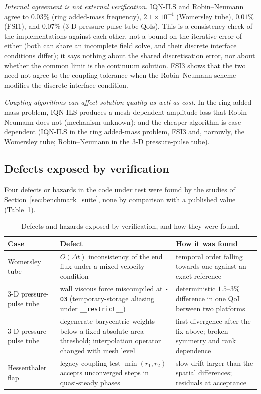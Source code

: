 \emph{Internal agreement is not external verification.}
IQN-ILS and Robin--Neumann agree to $0.03\%$ (ring added-mass frequency), $2.1\times10^{-4}$ (Womersley tube), $0.01\%$ (FSI1), and $0.07\%$ (3-D pressure-pulse tube QoIs).
This is a consistency check of the implementations against each other, not a bound on the iterative error of either (both can share an incomplete field solve, and their discrete interface conditions differ); it says nothing about the shared discretisation error, nor about whether the common limit is the continuum solution.
FSI3 shows that the two need not agree to the coupling tolerance when the Robin--Neumann scheme modifies the discrete interface condition.

\emph{Coupling algorithms can affect solution quality as well as cost.}
In the ring added-mass problem, IQN-ILS produces a mesh-dependent amplitude loss that Robin--Neumann does not (mechanism unknown); and the cheaper algorithm is case dependent (IQN-ILS in the ring added-mass problem, FSI3 and, narrowly, the Womersley tube; Robin--Neumann in the 3-D pressure-pulse tube).


\subsection{Defects exposed by verification}\label{sec:defects}

Four defects or hazards in the code under test were found by the studies of Section~\ref{sec:benchmark_suite}, none by comparison with a published value (Table~\ref{tab:defects}).

\begin{table}[htbp]
	\centering
	\footnotesize
	\setlength{\tabcolsep}{3pt}
	\caption{Defects and hazards exposed by verification, and how they were found.}
	\label{tab:defects}
	\begin{tabular}{p{2.6cm}p{5.6cm}p{5.6cm}}
		\toprule
		Case & Defect & How it was found \\
		\midrule
		Womersley tube & $O(\Delta t)$ inconsistency of the end flux under a mixed velocity condition & temporal order falling towards one against an exact reference \\
		3-D pressure-pulse tube & wall viscous force miscompiled at \texttt{-O3} (temporary-storage aliasing under \texttt{\_\_restrict\_\_}) & deterministic $1.5$--$3\%$ difference in one QoI between two platforms \\
		3-D pressure-pulse tube & degenerate barycentric weights below a fixed absolute area threshold; interpolation operator changed with mesh level & first divergence after the fix above; broken symmetry and rank dependence \\
		Hessenthaler flap & legacy coupling test $\min(r_1, r_2)$ accepts unconverged steps in quasi-steady phases & slow drift larger than the spatial differences; residuals at acceptance \\
		\bottomrule
	\end{tabular}
\end{table}

